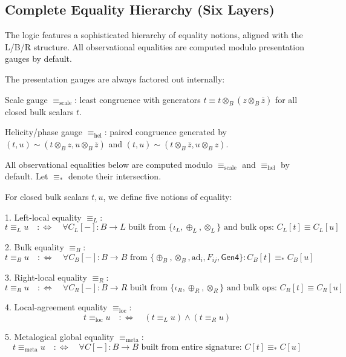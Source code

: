 \subsection{Complete Equality Hierarchy (Six Layers)}

The logic features a sophisticated hierarchy of equality notions, aligned with the L/B/R structure. All observational equalities are computed modulo presentation gauges by default.

\begin{definition}
\label{def:presentation-gauges}
The presentation gauges are always factored out internally:

Scale gauge $\equiv_{\text{scale}}$: least congruence with generators $t \equiv t \otimes_B (z \otimes_B \bar{z})$ for all closed bulk scalars $t$.

Helicity/phase gauge $\equiv_{\text{hel}}$: paired congruence generated by $(t,u) \sim (t \otimes_B z, u \otimes_B \bar{z})$ and $(t,u) \sim (t \otimes_B \bar{z}, u \otimes_B z)$.

All observational equalities below are computed modulo $\equiv_{\text{scale}}$ and $\equiv_{\text{hel}}$ by default. Let $\equiv_*$ denote their intersection.
\end{definition}

\begin{definition}
\label{def:observational-equalities}
For closed bulk scalars $t, u$, we define five notions of equality:

1. Left-local equality $\equiv_L$:
\[
t \equiv_L u \quad :\Leftrightarrow \quad \forall C_L[-]: B \to L \text{ built from } \{\iota_L, \oplus_L, \otimes_L\} \text{ and bulk ops: } C_L[t] \equiv C_L[u]
\]

2. Bulk equality $\equiv_B$:
\[
t \equiv_B u \quad :\Leftrightarrow \quad \forall C_B[-]: B \to B \text{ from } \{\oplus_B, \otimes_B, \text{ad}_i, F_{ij}, \mathsf{Gen4}\}: C_B[t] \equiv_* C_B[u]
\]

3. Right-local equality $\equiv_R$:
\[
t \equiv_R u \quad :\Leftrightarrow \quad \forall C_R[-]: B \to R \text{ built from } \{\iota_R, \oplus_R, \otimes_R\} \text{ and bulk ops: } C_R[t] \equiv C_R[u]
\]

4. Local-agreement equality $\equiv_{\text{loc}}$:
\[
t \equiv_{\text{loc}} u \quad :\Leftrightarrow \quad (t \equiv_L u) \land (t \equiv_R u)
\]

5. Metalogical global equality $\equiv_{\text{meta}}$:
\[
t \equiv_{\text{meta}} u \quad :\Leftrightarrow \quad \forall C[-]: B \to B \text{ built from entire signature: } C[t] \equiv_* C[u]
\]
\end{definition}

